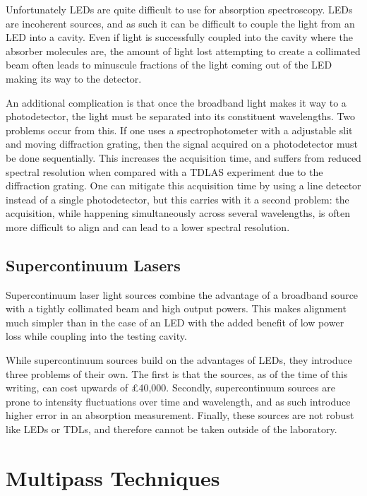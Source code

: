 Unfortunately \acp{LED} are quite difficult to use for absorption spectroscopy.
\acp{LED} are incoherent sources, and as such it can be difficult to couple the
light from an \ac{LED} into a cavity. Even if light is successfully coupled
into the cavity where the absorber molecules are, the amount of light lost
attempting to create a collimated beam often leads to minuscule fractions of
the light coming out of the \ac{LED} making its way to the detector.

An additional complication is that once the broadband light makes it way to a
photodetector, the light must be separated into its constituent wavelengths.
Two problems occur from this. If one uses a spectrophotometer with a adjustable
slit and moving diffraction grating, then the signal acquired on a
photodetector must be done sequentially. This increases the acquisition time,
and suffers from reduced spectral resolution when compared with a \ac{TDLAS}
experiment due to the diffraction grating. One can mitigate this acquisition
time by using a line detector instead of a single photodetector, but this
carries with it a second problem: the acquisition, while happening
simultaneously across several wavelengths, is often more difficult to align and
can lead to a lower spectral resolution.

\subsection{Supercontinuum Lasers}

Supercontinuum laser light sources combine the advantage of a broadband source
with a tightly collimated beam and high output powers. This makes alignment
much simpler than in the case of an \ac{LED} with the added benefit of low
power loss while coupling into the testing cavity.

While supercontinuum sources build on the advantages of \acp{LED}, they
introduce three problems of their own. The first is that the sources, as of the
time of this writing, can cost upwards of \pounds40,000. Secondly,
supercontinuum sources are prone to intensity fluctuations over time and
wavelength, and as such introduce higher error in an absorption measurement.
Finally, these sources are not robust like \acp{LED} or \acp{TDL}, and
therefore cannot be taken outside of the laboratory.

\section{Multipass Techniques}

